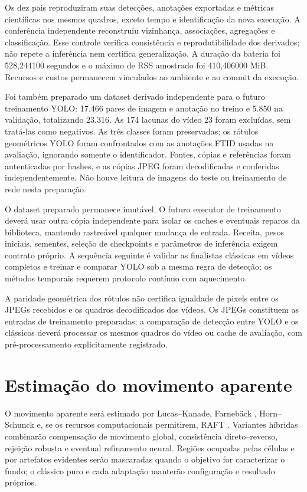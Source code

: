 Os dez pais reproduziram suas detecções, anotações exportadas e métricas científicas nos mesmos quadros, exceto tempo e identificação da nova execução. A conferência independente reconstruiu vizinhança, associações, agregações e classificação. Esse controle verifica consistência e reprodutibilidade dos derivados; não repete a inferência nem certifica generalização. A duração da bateria foi 528,244100 segundos e o máximo de RSS amostrado foi 410,406000 MiB. Recursos e custos permanecem vinculados ao ambiente e ao commit da execução.

Foi também preparado um dataset derivado independente para o futuro treinamento YOLO: 17.466 pares de imagem e anotação no treino e 5.850 na validação, totalizando 23.316. As 174 lacunas do vídeo 23 foram excluídas, sem tratá-las como negativos. As três classes foram preservadas; os rótulos geométricos YOLO foram confrontados com as anotações FTID usadas na avaliação, ignorando somente o identificador. Fontes, cópias e referências foram autenticadas por hashes, e as cópias JPEG foram decodificadas e conferidas independentemente. Não houve leitura de imagens do teste ou treinamento de rede nesta preparação.

O dataset preparado permanece imutável. O futuro executor de treinamento deverá usar outra cópia independente para isolar os caches e eventuais reparos da biblioteca, mantendo rastreável qualquer mudança de entrada. Receita, pesos iniciais, sementes, seleção de checkpoints e parâmetros de inferência exigem contrato próprio. A sequência seguinte é validar as finalistas clássicas em vídeos completos e treinar e comparar YOLO sob a mesma regra de detecção; os métodos temporais requerem protocolo contínuo com aquecimento.

A paridade geométrica dos rótulos não certifica igualdade de pixels entre os JPEGs recebidos e os quadros decodificados dos vídeos. Os JPEGs constituem as entradas de treinamento preparadas; a comparação de detecção entre YOLO e os clássicos deverá processar os mesmos quadros do vídeo ou cache de avaliação, com pré-processamento explicitamente registrado.

\section{Estimação do movimento aparente}

O movimento aparente será estimado por Lucas--Kanade, Farnebäck \cite{farneback2003twoframe}, Horn--Schunck e, se os recursos computacionais permitirem, RAFT \cite{teed2020raft}. Variantes híbridas combinarão compensação de movimento global, consistência direto--reverso, rejeição robusta e eventual refinamento neural. Regiões ocupadas pelas células e por artefatos evidentes serão mascaradas quando o objetivo for caracterizar o fundo; o clássico puro e cada adaptação manterão configuração e resultado próprios.

